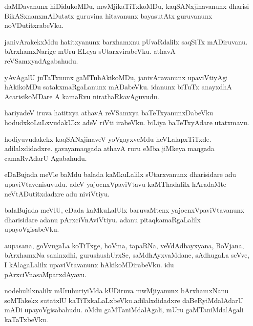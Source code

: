 \documentclass{article}
\begin{document}
\begin{mn}
daMDavanunx hiDidukoMDu, mwMjikaTiTxkoMDu, kaqSANxjinavanunx dharisi BikASxnanxmADutatx guruvina 
hitavanunx bayasutAtx guruvanunx noVDutitxrabeVku.
\end{mn}

\begin{mn}
janivArakekxMdu hatitxyanunx barxhamxnu pUvaRdalilx saqSiTx mADiruvanu. bArxhamxNarige mUru ELeya 
sUtarxvirabeVku. athavA reVSamxyadAgabahudu.
\end{mn}

\begin{mn}
yAvAgalU juTaTxnunx gaMTuhAkikoMDu, janivAravanunx upaviVtiyAgi hAkikoMDu satakxmaRgaLanunx 
mADabeVku. idanunx biTuTx anayxdhA AcarisikoMDare A kamaRvu nirathaRkavAguvudu.
\end{mn}

\begin{mn}
hariyadeV iruva hatitxya athavA reVSamxya baTeTxyanunxDabeVku hodudxkoLuLxvudakUkx 
adeV riVti irabeVku. biLiya baTeTxyAdare utatxmavu.
\end{mn}

\begin{mn}
hodiyuvudakekx kaqSANxjinaveV yoVgayxveMdu heVLalapxTiTxde. adilalxdidadxre. gavayamaqgada athavA 
ruru eMba jiMkeya maqgada camaRvAdarU Agabahudu.
\end{mn}

\begin{mn}
eDaBujada meVle baMdu balada kaMkuLalilx sUtarxvanunx dharisidare adu upaviVtavenisuvudu. adeV 
yajocnxVpaviVtavu kaMThadalilx hAradaMte neVtADutitxdadxre adu niviVtiyu.
\end{mn}

\begin{mn}
balaBujada meVlU, eDada  kaMkuLalUlx baruvaMtenx yajocnxVpaviVtavanunx dharisidare adanu 
pArxciVnAviVtiyu. adanu pitaqkamaRgaLalilx upayoVgisabeVku.
\end{mn}

\begin{mn}
aupasana, goVvugaLa koTiTxge, hoVma, tapaRNa, veVdAdhayxyana, BoVjana, bArxhamxNa saninxdhi, 
gurushushUrxSe, saMdhAyxvaMdane, sAdhugaLa seVve, I kAlagaLalilx upaviVtavanunx 
hAkikoMDirabeVku. idu pArxciVnasaMparxdAyavu.
\end{mn}

\begin{mn}
nodehulilxnalilx mUruhuriyiMda kUDiruva mwMjiyanunx bArxhamxNanu soMTakekx sutatxlU 
kaTiTxkaLaLxbeVku.adilalxdidadxre daBeRyiMdalAdarU mADi upayoVgisabahudu. oMdu gaMTaniMdalAgali, 
mUru gaMTaniMdalAgali kaTaTxbeVku.
\end{mn}
\end{document}
